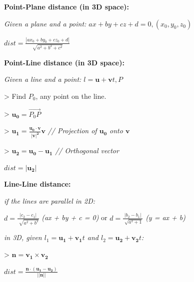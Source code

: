 \documentclass[8pt,a4paper,landscape,oneside]{amsart}
\begin{document}
\begin{multicols*}{3}
  \textbf{Point-Plane distance (in 3D space):} 

  \textit{Given a plane and a point: $ax+by+cz+d=0, (x_0, y_0, z_0)$}

  $dist = \frac{|ax_0+by_0+cz_0+d|}{\sqrt{a^2+b^2+c^2}}$
\newline

  \textbf{Point-Line distance (in 3D space):} 

  \textit{Given a line and a point: $l = \mathbf{u} + \mathbf{v}t, P$}

  > Find $P_0$, any point on the line.

  > $\mathbf{u_0} = \overrightarrow{P_0P}$

  > $\mathbf{u_1} = \mathbf{\frac{u_0 \cdot v}{|v|^2} v}$ \textit{// Projection of $\mathbf{u_0}$ onto $\mathbf{v}$}

  > $\mathbf{u_2} = \mathbf{u_0 - u_1}$ \textit{// Orthogonal vector}

  $dist = |\mathbf{u_2}|$
  \newline

  \textbf{Line-Line distance:} 

  \textit{if the lines are parallel in 2D:}

  $d = \frac{|c_2 - c_1|}{\sqrt[]{a^2 + b^2}}$ \textit{(ax + by + c = 0)} or $d = \frac{|b_2 - b_1|}{\sqrt[]{a^2 + 1}}$ \textit{(y = ax + b)}
  \newline

  \textit{in 3D, given $l_1 = \mathbf{u_1} + \mathbf{v_1}t$ and $l_2 = \mathbf{u_2} + \mathbf{v_2}t$:}

  > $\mathbf{n} = \mathbf{v_1} \times \mathbf{v_2}$

  $dist = \frac{\mathbf{n\cdot (u_1 - u_2)}}{||\mathbf{n}||}$
  

\end{multicols*}
\end{document}
